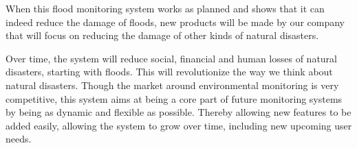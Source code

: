When this flood monitoring system works as planned and shows that it can indeed reduce the damage of floods, new products will be made by our company that will focus on reducing the damage of other kinds of natural disasters.

Over time, the system will reduce social, financial and human losses of natural disasters, starting with floods. This will revolutionize the way we think about natural disasters. Though the market around environmental monitoring is very competitive, this system aims at being a core part of future monitoring systems by being as dynamic and flexible as possible. Thereby allowing new features to be added easily, allowing the system to grow over time, including new upcoming user needs.